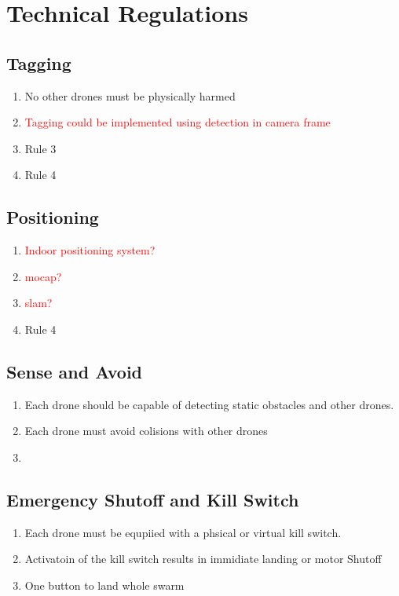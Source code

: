 \section{Technical Regulations}
\subsection{Tagging}
\begin{enumerate}
	\item{No other drones must be physically harmed}
	\item{\textcolor{red}{Tagging could be implemented using detection in camera frame}}
	\item{Rule 3}
	\item{Rule 4}
\end{enumerate}

\subsection{Positioning}
\begin{enumerate}
	\item{\textcolor{red}{Indoor positioning system?}}
	\item{\textcolor{red}{mocap?}}
	\item{\textcolor{red}{slam?}}
	\item{Rule 4}
\end{enumerate}

\subsection{Sense and Avoid}
\begin{enumerate}
	\item{Each drone should be capable of detecting static obstacles and other drones.}
	\item{Each drone must avoid colisions with other drones}
	\item{}
\end{enumerate}

\subsection{Emergency Shutoff and Kill Switch}
\begin{enumerate}
	\item{Each drone must be equpiied with a phsical or virtual kill switch.}
	\item{Activatoin of the kill switch results in immidiate landing or motor Shutoff}
	\item{One button to land whole swarm}
\end{enumerate}



